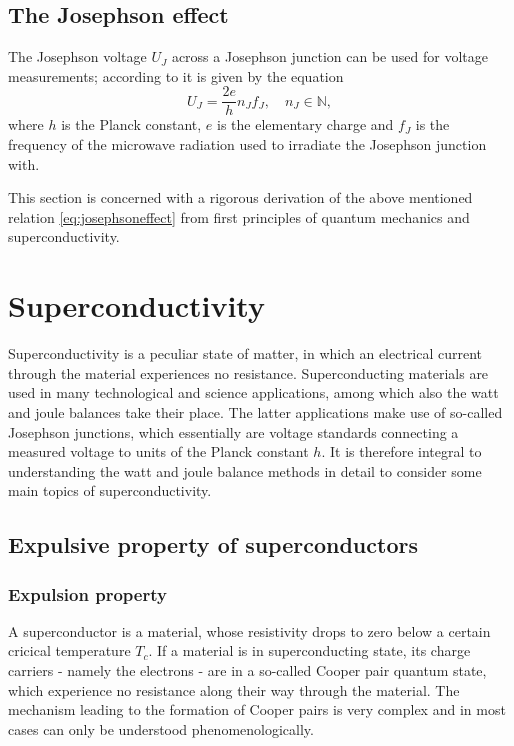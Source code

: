 \documentclass{report}
\numberwithin{tm}{section}
\begin{document}

	
\section{The Josephson effect}
	The Josephson voltage $U_J$ across a Josephson junction can be used for voltage measurements; according to \cite{Kajastie_2009} it is given by the equation \begin{equation}\label{eq:josephsoneffect}
		U_J = \frac{2e}{h}n_Jf_J, \quad n_J \in \mathbb{N},
	\end{equation} where $h$ is the Planck constant, $e$ is the elementary charge and $f_J$ is the frequency of the microwave radiation used to irradiate the Josephson junction with.
	
	This section is concerned with a rigorous derivation of the above mentioned relation \cref{eq:josephsoneffect} from first principles of quantum mechanics and superconductivity.
	
\chapter{Superconductivity}
Superconductivity is a peculiar state of matter, in which an electrical current through the material experiences no resistance. Superconducting materials are used in many technological and science applications, among which also the watt and joule balances take their place. The latter applications make use of so-called Josephson junctions, which essentially are voltage standards connecting a measured voltage to units of the Planck constant $h$. It is therefore integral to understanding the watt and joule balance methods in detail to consider some main topics of superconductivity.

\section{Expulsive property of superconductors}

\subsection{Expulsion property}
A superconductor is a material, whose resistivity drops to zero below a certain cricical temperature $T_c$. If a material is in superconducting state, its charge carriers - namely the electrons - are in a so-called Cooper pair quantum state, which experience no resistance along their way through the material. The mechanism leading to the formation of Cooper pairs is very complex and in most cases can only be understood phenomenologically. 
\end{document}
